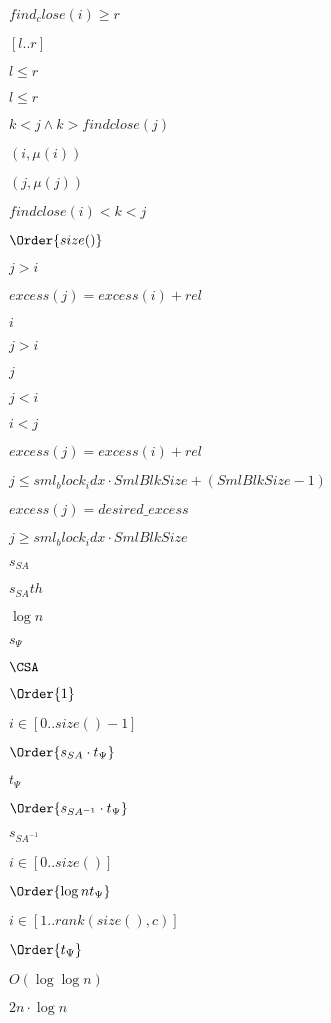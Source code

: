 \documentclass{article}
\begin{document}
$ find_close(i) \geq r $
\pagebreak

$[l..r]$
\pagebreak

$l\leq r$
\pagebreak

$l \leq r$
\pagebreak

$ k<j \wedge k>findclose(j) $
\pagebreak

$(i,\mu(i))$
\pagebreak

$(j,\mu(j))$
\pagebreak

$ findclose(i) < k < j$
\pagebreak

$ \Order{size()}$
\pagebreak

$ j>i $
\pagebreak

$ excess(j) = excess(i)+rel $
\pagebreak

$i$
\pagebreak

$ j>i$
\pagebreak

$j$
\pagebreak

$ j<i $
\pagebreak

$i<j$
\pagebreak

$ excess(j) = excess(i)+rel$
\pagebreak

$ j \leq sml_block_idx\cdot SmlBlkSize+(SmlBlkSize-1) $
\pagebreak

$ excess(j)=desired\_excess $
\pagebreak

$ j \geq sml_block_idx\cdot SmlBlkSize $
\pagebreak

$s_{SA}$
\pagebreak

$s_{SA}th$
\pagebreak

$\log n$
\pagebreak

$s_{\Psi}$
\pagebreak

$\CSA$
\pagebreak

$ \Order{1} $
\pagebreak

$ i \in [0..size()-1]$
\pagebreak

$ \Order{s_{SA}\cdot t_{\Psi}} $
\pagebreak

$t_{\Psi}$
\pagebreak

$ \Order{s_{SA^{-1}}\cdot t_{\Psi}} $
\pagebreak

$s_{SA^{-1}}$
\pagebreak

$i\in [0..size()]$
\pagebreak

$ \Order{\log n t_{\Psi}} $
\pagebreak

$i\in [1..rank(size(),c)]$
\pagebreak

$ \Order{t_{\Psi}} $
\pagebreak

$O(\log\log n)$
\pagebreak

$ 2n\cdot \log n$
\pagebreak
\end{document}
